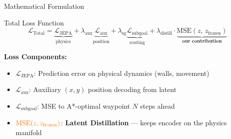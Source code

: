 \documentclass{beamer}
\begin{document}
\begin{frame}{Mathematical Formulation}
    \begin{block}{Total Loss Function}
    \vspace{0.2cm}
    $$ \mathcal{L}_{\text{Total}} = \underbrace{\mathcal{L}_{\text{JEPA}}}_{\text{physics}} + \lambda_{\text{aux}}\underbrace{\mathcal{L}_{\text{aux}}}_{\text{position}} + \lambda_{\text{sg}}\underbrace{\mathcal{L}_{\text{subgoal}}}_{\text{routing}} + \lambda_{\text{distill}} \cdot \underbrace{\text{MSE}(z,\, z_{\text{frozen}})}_{\textbf{our contribution}} $$
    \vspace{0.1cm}
    \end{block}

    \vspace{0.5cm}
    \textbf{Loss Components:}
    \begin{itemize}
        \item $\mathcal{L}_{\text{JEPA}}$: Prediction error on physical dynamics (walls, movement)
        \item $\mathcal{L}_{\text{aux}}$: Auxiliary $(x, y)$ position decoding from latent
        \item $\mathcal{L}_{\text{subgoal}}$: MSE to A*-optimal waypoint $N$ steps ahead
        \item $\textcolor{accent}{\text{MSE}(z, z_{\text{frozen}})}$: \textbf{Latent Distillation} --- keeps encoder on the physics manifold
    \end{itemize}
\end{frame}
\end{document}
